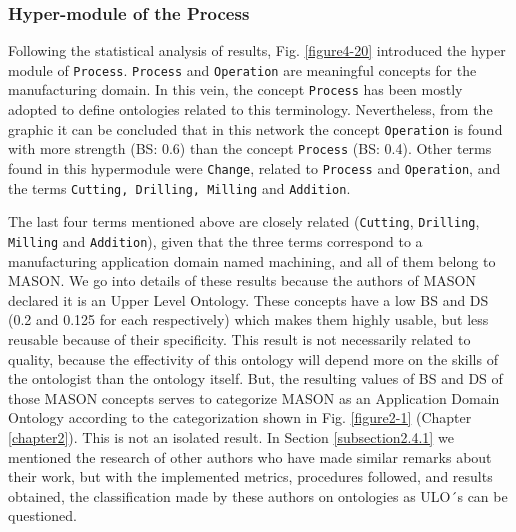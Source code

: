 \subsubsection{Hyper-module of the Process}\label{subsubsection4.2.5.3}

Following the statistical   analysis of results, Fig. \ref{figure4-20} introduced the hyper module of \texttt{Process}. \texttt{Process} and \texttt{Operation} are meaningful concepts for the manufacturing domain. In this vein, the concept \texttt{Process} has been mostly adopted to define ontologies related to this terminology. Nevertheless, from the graphic it can be concluded that in this network the concept \texttt{Operation} is found with more strength   (BS: 0.6) than the concept \texttt{Process} (BS: 0.4). Other terms found in this hypermodule were \texttt{Change}, related to \texttt{Process} and \texttt{Operation}, and the terms \texttt{Cutting, Drilling, Milling} and \texttt{Addition}. 

The last four terms mentioned above are closely related (\texttt{Cutting}, \texttt{Drilling}, \texttt{Milling} and \texttt{Addition}), given that   the three terms correspond to a manufacturing application domain named machining, and all of them belong to MASON. We go into details of these results because the authors of MASON declared it is an Upper Level Ontology. These concepts have a low BS and DS (0.2 and 0.125 for each respectively) which makes them highly usable, but less reusable because of their specificity. This result is not necessarily related to quality, because the effectivity of this ontology will depend more on the skills of the ontologist than the ontology itself. But, the resulting values of BS and DS of those MASON concepts serves  to categorize MASON as an Application Domain Ontology according to the categorization  shown in Fig. \ref{figure2-1} (Chapter \ref{chapter2}). This is not an isolated result. In Section \ref{subsection2.4.1} we  mentioned the research of other authors who have made similar remarks about their work, but with the implemented metrics,  procedures followed, and results obtained, the classification made by these authors  on  ontologies as ULO´s can be questioned. 


